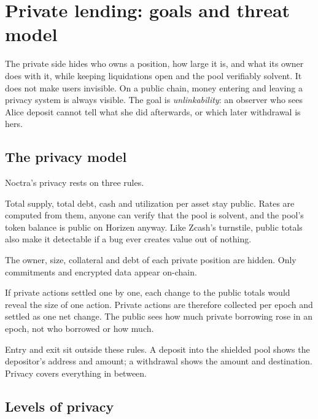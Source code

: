 \documentclass[11pt,a4paper]{article}
\begin{document}
\section{Private lending: goals and threat model}

The private side hides who owns a position, how large it is, and what its owner does with it, while keeping
liquidations open and the pool verifiably solvent. It does not make users invisible. On a public chain, money
entering and leaving a privacy system is always visible. The goal is \emph{unlinkability}: an observer who sees
Alice deposit cannot tell what she did afterwards, or which later withdrawal is hers.

\subsection{The privacy model}
\label{sec:privmodel}

Noctra's privacy rests on three rules.
\begin{description}[leftmargin=0pt, labelsep=0.5em]
  \item[Aggregates are public.] Total supply, total debt, cash and utilization per asset stay public. Rates are
        computed from them, anyone can verify that the pool is solvent, and the pool's token balance is public on
        Horizen anyway. Like Zcash's turnstile, public totals also make it detectable if a bug ever creates value
        out of nothing.
  \item[Positions are private.] The owner, size, collateral and debt of each private position are hidden. Only
        commitments and encrypted data appear on-chain.
  \item[Changes are batched.] If private actions settled one by one, each change to the public totals would
        reveal the size of one action. Private actions are therefore collected per epoch and settled as one net
        change. The public sees how much private borrowing rose in an epoch, not who borrowed or how much.
\end{description}
Entry and exit sit outside these rules. A deposit into the shielded pool shows the depositor's address and
amount; a withdrawal shows the amount and destination. Privacy covers everything in between.

\subsection{Levels of privacy}
\end{document}
